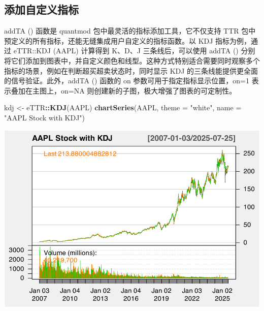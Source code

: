 \documentclass[]{ctexbook}
\newenvironment{Shaded}{\begin{snugshade}}{\end{snugshade}}
\newcommand{\AttributeTok}[1]{\textcolor[rgb]{0.13,0.29,0.53}{#1}}
\newcommand{\CommentTok}[1]{\textcolor[rgb]{0.56,0.35,0.01}{\textit{#1}}}
\newcommand{\FunctionTok}[1]{\textcolor[rgb]{0.13,0.29,0.53}{\textbf{#1}}}
\newcommand{\NormalTok}[1]{#1}
\newcommand{\OtherTok}[1]{\textcolor[rgb]{0.56,0.35,0.01}{#1}}
\newcommand{\SpecialCharTok}[1]{\textcolor[rgb]{0.81,0.36,0.00}{\textbf{#1}}}
\newcommand{\StringTok}[1]{\textcolor[rgb]{0.31,0.60,0.02}{#1}}
\begin{document}
\subsection{添加自定义指标}\label{ux6dfbux52a0ux81eaux5b9aux4e49ux6307ux6807}

addTA () 函数是 quantmod 包中最灵活的指标添加工具，它不仅支持 TTR 包中预定义的所有指标，还能无缝集成用户自定义的指标函数。以 KDJ 指标为例，通过 eTTR::KDJ (AAPL) 计算得到 K、D、J 三条线后，可以使用 addTA () 分别将它们添加到图表中，并自定义颜色和线型。这种方式特别适合需要同时观察多个指标的场景，例如在判断超买超卖状态时，同时显示 KDJ 的三条线能提供更全面的信号验证。此外，addTA () 函数的 on 参数可用于指定指标显示位置，on=1 表示叠加在主图上，on=NA 则创建新的子图，极大增强了图表的可定制性。

\begin{Shaded}
\begin{Highlighting}[]
\NormalTok{kdj }\OtherTok{\textless{}{-}}\NormalTok{ eTTR}\SpecialCharTok{::}\FunctionTok{KDJ}\NormalTok{(AAPL)}
\FunctionTok{chartSeries}\NormalTok{(AAPL, }\AttributeTok{theme =} \StringTok{"white"}\NormalTok{, }\AttributeTok{name =} \StringTok{"AAPL Stock with KDJ"}\NormalTok{)}
\end{Highlighting}
\end{Shaded}

\includegraphics[width=0.9\linewidth]{QuantmodHandbook_files/figure-latex/defi-1}

\begin{Shaded}
\end{Shaded}
\end{document}
